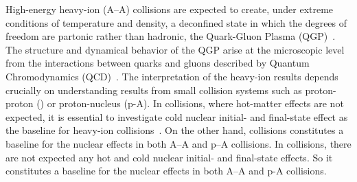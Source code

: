 \documentclass[ALICE,manyauthors]{cernphprep}
\begin{document}
High-energy heavy-ion (A--A) collisions are expected to create, under extreme conditions of temperature and density, a deconfined state in which the degrees of freedom are partonic rather than hadronic, the Quark-Gluon Plasma (QGP)~\cite{Rafelski:126179, Satz:2000bn, Shuryak:1983ni, Jacak:2012dx, Cleymans:1985wb, Bass:1998vz, BraunMunzinger:2007zz}.
The structure and dynamical behavior of the QGP arise at the microscopic level from the interactions between quarks and gluons described by Quantum Chromodynamics (QCD)~\cite{Laermann:2003cv, Gupta:2011wh, Bhattacharya:2014ara}.
The interpretation of the heavy-ion results depends crucially on understanding results from small collision systems such as proton-proton (\pp) or proton-nucleus (p-A).
In \pPb collisions, where hot-matter effects are not expected, it is essential to investigate cold nuclear initial- and final-state effect as the baseline for heavy-ion collisions~\cite{Salgado:2011wc, Eskola:2016oht}.
On the other hand, \pp collisions constitutes a baseline for the nuclear effects in both A--A and p--A collisions.
In \pp collisions, there are not expected any hot and cold nuclear initial- and final-state effects.
So it constitutes a baseline for the nuclear effects in both A--A and p-A collisions.
\end{document}
